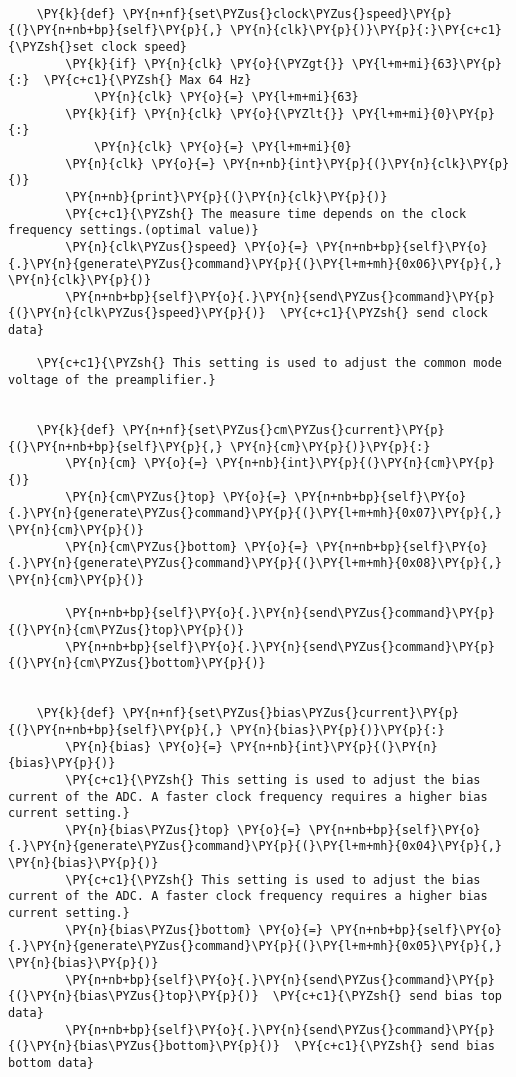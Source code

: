 \begin{tcolorbox}[breakable, size=fbox, boxrule=1pt, pad at break*=1mm,colback=cellbackground, colframe=cellborder]
\begin{Verbatim}[commandchars=\\\{\}]
		
	\PY{k}{def} \PY{n+nf}{set\PYZus{}clock\PYZus{}speed}\PY{p}{(}\PY{n+nb+bp}{self}\PY{p}{,} \PY{n}{clk}\PY{p}{)}\PY{p}{:}\PY{c+c1}{\PYZsh{}set clock speed}
		\PY{k}{if} \PY{n}{clk} \PY{o}{\PYZgt{}} \PY{l+m+mi}{63}\PY{p}{:}  \PY{c+c1}{\PYZsh{} Max 64 Hz}
			\PY{n}{clk} \PY{o}{=} \PY{l+m+mi}{63}
		\PY{k}{if} \PY{n}{clk} \PY{o}{\PYZlt{}} \PY{l+m+mi}{0}\PY{p}{:}
			\PY{n}{clk} \PY{o}{=} \PY{l+m+mi}{0}
		\PY{n}{clk} \PY{o}{=} \PY{n+nb}{int}\PY{p}{(}\PY{n}{clk}\PY{p}{)}
		\PY{n+nb}{print}\PY{p}{(}\PY{n}{clk}\PY{p}{)}
		\PY{c+c1}{\PYZsh{} The measure time depends on the clock frequency settings.(optimal value)}
		\PY{n}{clk\PYZus{}speed} \PY{o}{=} \PY{n+nb+bp}{self}\PY{o}{.}\PY{n}{generate\PYZus{}command}\PY{p}{(}\PY{l+m+mh}{0x06}\PY{p}{,} \PY{n}{clk}\PY{p}{)}
		\PY{n+nb+bp}{self}\PY{o}{.}\PY{n}{send\PYZus{}command}\PY{p}{(}\PY{n}{clk\PYZus{}speed}\PY{p}{)}  \PY{c+c1}{\PYZsh{} send clock data}

	\PY{c+c1}{\PYZsh{} This setting is used to adjust the common mode voltage of the preamplifier.}

	
	\PY{k}{def} \PY{n+nf}{set\PYZus{}cm\PYZus{}current}\PY{p}{(}\PY{n+nb+bp}{self}\PY{p}{,} \PY{n}{cm}\PY{p}{)}\PY{p}{:}
		\PY{n}{cm} \PY{o}{=} \PY{n+nb}{int}\PY{p}{(}\PY{n}{cm}\PY{p}{)}
		\PY{n}{cm\PYZus{}top} \PY{o}{=} \PY{n+nb+bp}{self}\PY{o}{.}\PY{n}{generate\PYZus{}command}\PY{p}{(}\PY{l+m+mh}{0x07}\PY{p}{,} \PY{n}{cm}\PY{p}{)}
		\PY{n}{cm\PYZus{}bottom} \PY{o}{=} \PY{n+nb+bp}{self}\PY{o}{.}\PY{n}{generate\PYZus{}command}\PY{p}{(}\PY{l+m+mh}{0x08}\PY{p}{,} \PY{n}{cm}\PY{p}{)}

		\PY{n+nb+bp}{self}\PY{o}{.}\PY{n}{send\PYZus{}command}\PY{p}{(}\PY{n}{cm\PYZus{}top}\PY{p}{)}
		\PY{n+nb+bp}{self}\PY{o}{.}\PY{n}{send\PYZus{}command}\PY{p}{(}\PY{n}{cm\PYZus{}bottom}\PY{p}{)}


	\PY{k}{def} \PY{n+nf}{set\PYZus{}bias\PYZus{}current}\PY{p}{(}\PY{n+nb+bp}{self}\PY{p}{,} \PY{n}{bias}\PY{p}{)}\PY{p}{:}
		\PY{n}{bias} \PY{o}{=} \PY{n+nb}{int}\PY{p}{(}\PY{n}{bias}\PY{p}{)}
		\PY{c+c1}{\PYZsh{} This setting is used to adjust the bias current of the ADC. A faster clock frequency requires a higher bias current setting.}
		\PY{n}{bias\PYZus{}top} \PY{o}{=} \PY{n+nb+bp}{self}\PY{o}{.}\PY{n}{generate\PYZus{}command}\PY{p}{(}\PY{l+m+mh}{0x04}\PY{p}{,} \PY{n}{bias}\PY{p}{)}
		\PY{c+c1}{\PYZsh{} This setting is used to adjust the bias current of the ADC. A faster clock frequency requires a higher bias current setting.}
		\PY{n}{bias\PYZus{}bottom} \PY{o}{=} \PY{n+nb+bp}{self}\PY{o}{.}\PY{n}{generate\PYZus{}command}\PY{p}{(}\PY{l+m+mh}{0x05}\PY{p}{,} \PY{n}{bias}\PY{p}{)}
		\PY{n+nb+bp}{self}\PY{o}{.}\PY{n}{send\PYZus{}command}\PY{p}{(}\PY{n}{bias\PYZus{}top}\PY{p}{)}  \PY{c+c1}{\PYZsh{} send bias top data}
		\PY{n+nb+bp}{self}\PY{o}{.}\PY{n}{send\PYZus{}command}\PY{p}{(}\PY{n}{bias\PYZus{}bottom}\PY{p}{)}  \PY{c+c1}{\PYZsh{} send bias bottom data}



\end{Verbatim}
\end{tcolorbox}
